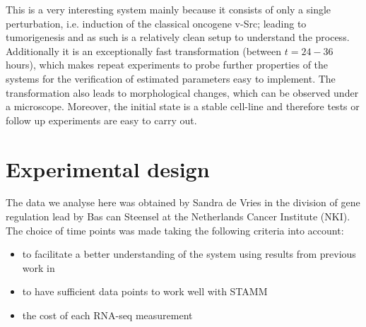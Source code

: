 This is a very interesting system mainly because it consists of only a single perturbation, i.e. induction of the classical oncogene v-Src; leading to tumorigenesis and as such is a relatively clean setup to understand the process. Additionally it is an exceptionally fast transformation (between $t=24-36$ hours), which makes repeat experiments to probe further properties of the systems for the verification of estimated parameters easy to implement. The transformation also leads to morphological changes, which can be observed under a microscope. Moreover, the initial state is a stable cell-line and therefore tests or follow up experiments are easy to carry out.

\section{Experimental design}
\label{sec:experimental-design}

The data we analyse here was obtained by Sandra de Vries in the division of gene regulation lead by Bas can Steensel at the Netherlands Cancer Institute (NKI). The choice of time points was made taking the following criteria into account:
\begin{itemize}
\item to facilitate a better understanding of the system using results from previous work in \cite{Hirsch:2010ec}
\item to have sufficient data points to work well with STAMM
\item the cost of each RNA-seq measurement
\end{itemize}

